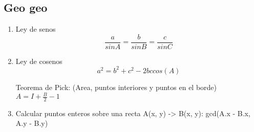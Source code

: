 %
%
%
%
% 
%
%
%

\subsection{Geo geo}
\begin{enumerate}

\item
Ley de senos
\begin{equation}
  \frac{a}{sinA} = \frac{b}{sinB} = \frac{c}{sinC}
\end{equation}

\item
Ley de cosenos
\begin{equation}
  a^2 =  b^2 + c^2 - 2bc cos(A)
\end{equation}

Teorema de Pick: (Area, puntos interiores y puntos en el borde)
$A=I+\frac{B}{2}-1$

\item
Calcular puntos enteros sobre una recta A(x, y) -> B(x, y):
gcd(A.x - B.x, A.y - B.y)

\end{enumerate}

